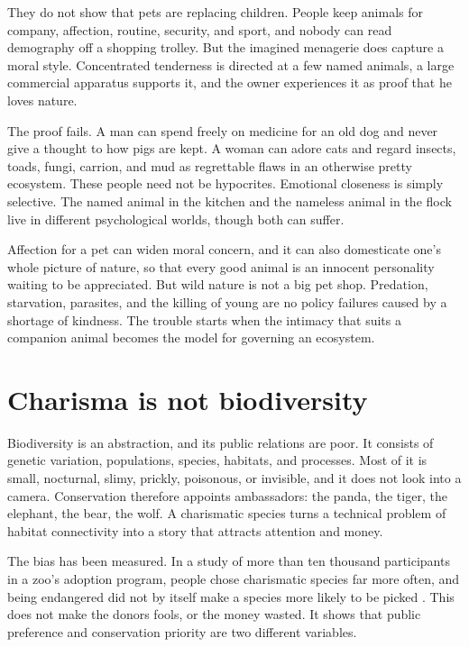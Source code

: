 \documentclass[12pt,a4paper]{book}
\begin{document}
They do not show that pets are replacing children. People keep animals for company, affection, routine, security, and sport, and nobody can read demography off a shopping trolley. But the imagined menagerie does capture a moral style. Concentrated tenderness is directed at a few named animals, a large commercial apparatus supports it, and the owner experiences it as proof that he loves nature.

The proof fails. A man can spend freely on medicine for an old dog and never give a thought to how pigs are kept. A woman can adore cats and regard insects, toads, fungi, carrion, and mud as regrettable flaws in an otherwise pretty ecosystem. These people need not be hypocrites. Emotional closeness is simply selective. The named animal in the kitchen and the nameless animal in the flock live in different psychological worlds, though both can suffer.

Affection for a pet can widen moral concern, and it can also domesticate one's whole picture of nature, so that every good animal is an innocent personality waiting to be appreciated. But wild nature is not a big pet shop. Predation, starvation, parasites, and the killing of young are no policy failures caused by a shortage of kindness. The trouble starts when the intimacy that suits a companion animal becomes the model for governing an ecosystem.

\section{Charisma is not biodiversity}

Biodiversity is an abstraction, and its public relations are poor. It consists of genetic variation, populations, species, habitats, and processes. Most of it is small, nocturnal, slimy, prickly, poisonous, or invisible, and it does not look into a camera. Conservation therefore appoints ambassadors: the panda, the tiger, the elephant, the bear, the wolf. A charismatic species turns a technical problem of habitat connectivity into a story that attracts attention and money.

The bias has been measured. In a study of more than ten thousand participants in a zoo's adoption program, people chose charismatic species far more often, and being endangered did not by itself make a species more likely to be picked \cite{ColleonyCharisma2017}. This does not make the donors fools, or the money wasted. It shows that public preference and conservation priority are two different variables.
\end{document}
